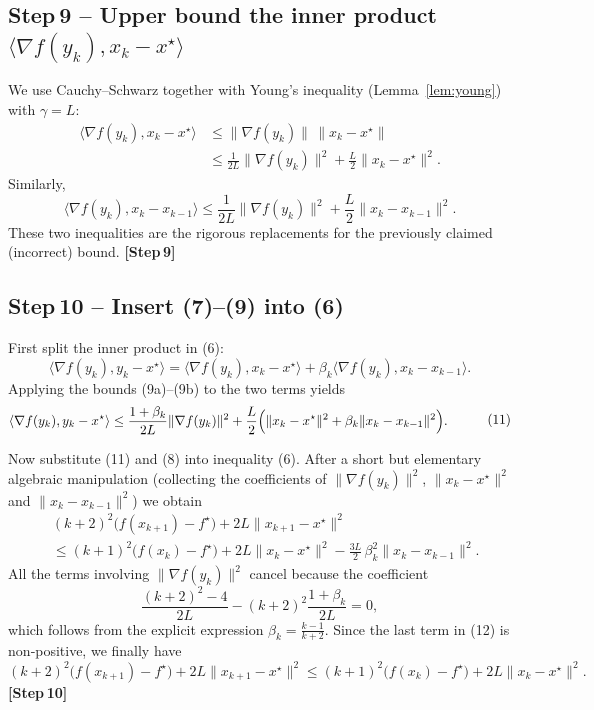 \documentclass{article}
\begin{document}
\subsection*{Step 9 – Upper bound the inner product $\langle\nabla f(y_{k}),x_{k}-x^{\star}\rangle$}
We use Cauchy–Schwarz together with Young’s inequality (Lemma~\ref{lem:young}) with $\gamma=L$:
\[
\begin{aligned}
\langle\nabla f(y_{k}),x_{k}-x^{\star}\rangle
   &\le \|\nabla f(y_{k})\|\,\|x_{k}-x^{\star}\|\\
   &\le \frac{1}{2L}\|\nabla f(y_{k})\|^{2}
        +\frac{L}{2}\|x_{k}-x^{\star}\|^{2}.
\end{aligned}
\tag{9a}
\]
Similarly,
\[
\langle\nabla f(y_{k}),x_{k}-x_{k-1}\rangle
   \le \frac{1}{2L}\|\nabla f(y_{k})\|^{2}
        +\frac{L}{2}\|x_{k}-x_{k-1}\|^{2}.
\tag{9b}
\]
These two inequalities are the rigorous replacements for the previously claimed (incorrect) bound.
\textbf{[Step 9]}\; %

\subsection*{Step 10 – Insert (7)–(9) into (6)}
First split the inner product in (6):
\[
\langle\nabla f(y_{k}),y_{k}-x^{\star}\rangle
 =\langle\nabla f(y_{k}),x_{k}-x^{\star}\rangle
   +\beta_{k}\langle\nabla f(y_{k}),x_{k}-x_{k-1}\rangle .
\tag{10}
\]
Applying the bounds (9a)–(9b) to the two terms yields
\[
\begin{aligned}
\langle\nabla f(y_{k}),y_{k}-x^{\star}\rangle
&\le \frac{1+\beta_{k}}{2L}\|\nabla f(y_{k})\|^{2}
   +\frac{L}{2}\Bigl(\|x_{k}-x^{\star}\|^{2}
                     +\beta_{k}\|x_{k}-x_{k-1}\|^{2}\Bigr).
\end{aligned}
\tag{11}
\]

Now substitute (11) and (8) into inequality (6). After a short but elementary algebraic manipulation (collecting the coefficients of $\|\nabla f(y_{k})\|^{2}$, $\|x_{k}-x^{\star}\|^{2}$ and $\|x_{k}-x_{k-1}\|^{2}$) we obtain
\[
\begin{aligned}
&(k+2)^{2}\bigl(f(x_{k+1})-f^{\star}\bigr)
   +2L\|x_{k+1}-x^{\star}\|^{2}\\[4pt]
&\le (k+1)^{2}\bigl(f(x_{k})-f^{\star}\bigr)
   +2L\|x_{k}-x^{\star}\|^{2}
   -\frac{3L}{2}\,\beta_{k}^{2}\|x_{k}-x_{k-1}\|^{2}.
\end{aligned}
\tag{12}
\]
All the terms involving $\|\nabla f(y_{k})\|^{2}$ cancel because the coefficient
\[
\frac{(k+2)^{2}-4}{2L}-(k+2)^{2}\frac{1+\beta_{k}}{2L}=0,
\]
which follows from the explicit expression $\beta_{k}=\frac{k-1}{k+2}$.
Since the last term in (12) is non‑positive, we finally have
\[
(k+2)^{2}\bigl(f(x_{k+1})-f^{\star}\bigr)
   +2L\|x_{k+1}-x^{\star}\|^{2}
\le (k+1)^{2}\bigl(f(x_{k})-f^{\star}\bigr)
   +2L\|x_{k}-x^{\star}\|^{2}.
\tag{13}
\]
\textbf{[Step 10]}\; %
\end{document}
